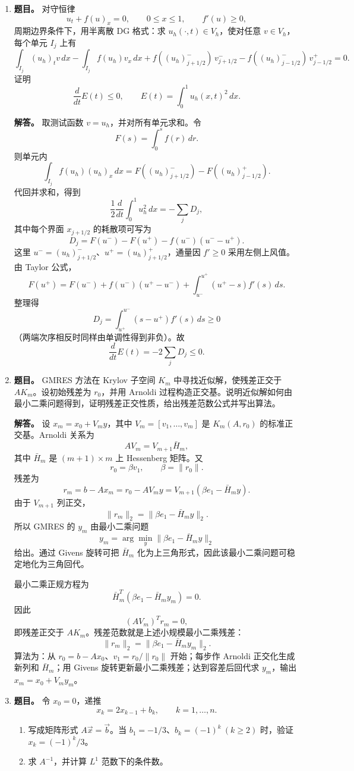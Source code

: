 ﻿\documentclass[UTF8,12pt]{ctexart}
\begin{document}
\begin{enumerate}[label=\textbf{\arabic*.},leftmargin=2.2em]
\item \textbf{题目。} 对守恒律
\[
u_t+f(u)_x=0,\qquad 0\le x\le1,\qquad f'(u)\ge0,
\]
周期边界条件下，用半离散 DG 格式：求 \(u_h(\cdot,t)\in V_h\)，使对任意 \(v\in V_h\)，每个单元 \(I_j\) 上有
\[
\int_{I_j}(u_h)_t v\,dx-\int_{I_j}f(u_h)v_x\,dx
+f((u_h)_{j+1/2}^-)\,v_{j+1/2}^-
-f((u_h)_{j-1/2}^-)\,v_{j-1/2}^+=0.
\]
证明
\[
\frac{d}{dt}E(t)\le0,\qquad
E(t)=\int_0^1 u_h(x,t)^2\,dx.
\]

\textbf{解答。} 取测试函数 \(v=u_h\)，并对所有单元求和。令
\[
F(s)=\int_0^s f(r)\,dr.
\]
则单元内
\[
\int_{I_j}f(u_h)(u_h)_x\,dx
=F((u_h)_{j+1/2}^-)-F((u_h)_{j-1/2}^+).
\]
代回并求和，得到
\[
\frac12\frac{d}{dt}\int_0^1u_h^2\,dx
=-\sum_j D_j,
\]
其中每个界面 \(x_{j+1/2}\) 的耗散项可写为
\[
D_j=
F(u^-)-F(u^+)-f(u^-)(u^- -u^+).
\]
这里 \(u^-=(u_h)_{j+1/2}^-\)、\(u^+=(u_h)_{j+1/2}^+\)，通量因 \(f'\ge0\) 采用左侧上风值。由 Taylor 公式，
\[
F(u^+)=F(u^-)+f(u^-)(u^+-u^-)
+\int_{u^-}^{u^+}(u^+-s)f'(s)\,ds.
\]
整理得
\[
D_j=\int_{u^+}^{u^-}(s-u^+)f'(s)\,ds\ge0
\]
（两端次序相反时同样由单调性得到非负）。故
\[
\frac{d}{dt}E(t)=-2\sum_jD_j\le0.
\]

\item \textbf{题目。} GMRES 方法在 Krylov 子空间 \(K_m\) 中寻找近似解，使残差正交于 \(AK_m\)。设初始残差为 \(r_0\)，并用 Arnoldi 过程构造正交基。说明近似解如何由最小二乘问题得到，证明残差正交性质，给出残差范数公式并写出算法。

\textbf{解答。} 设 \(x_m=x_0+V_my\)，其中 \(V_m=[v_1,\ldots,v_m]\) 是 \(K_m(A,r_0)\) 的标准正交基。Arnoldi 关系为
\[
AV_m=V_{m+1}\bar H_m,
\]
其中 \(\bar H_m\) 是 \((m+1)\times m\) 上 Hessenberg 矩阵。又
\[
r_0=\beta v_1,\qquad \beta=\|r_0\|.
\]
残差为
\[
r_m=b-Ax_m=r_0-AV_my
=V_{m+1}(\beta e_1-\bar H_my).
\]
由于 \(V_{m+1}\) 列正交，
\[
\|r_m\|_2=\|\beta e_1-\bar H_my\|_2.
\]
所以 GMRES 的 \(y_m\) 由最小二乘问题
\[
y_m=\arg\min_y\|\beta e_1-\bar H_my\|_2
\]
给出。通过 Givens 旋转可把 \(\bar H_m\) 化为上三角形式，因此该最小二乘问题可稳定地化为三角回代。

最小二乘正规方程为
\[
\bar H_m^T(\beta e_1-\bar H_my_m)=0.
\]
因此
\[
(AV_m)^Tr_m=0,
\]
即残差正交于 \(AK_m\)。残差范数就是上述小规模最小二乘残差：
\[
\|r_m\|_2=\|\beta e_1-\bar H_my_m\|_2.
\]
算法为：从 \(r_0=b-Ax_0\)、\(v_1=r_0/\|r_0\|\) 开始；每步作 Arnoldi 正交化生成新列和 \(\bar H_m\)；用 Givens 旋转更新最小二乘残差；达到容差后回代求 \(y_m\)，输出 \(x_m=x_0+V_my_m\)。

\item \textbf{题目。} 令 \(x_0=0\)，递推
\[
x_k=2x_{k-1}+b_k,\qquad k=1,\ldots,n.
\]
\begin{enumerate}[label=(\roman*),leftmargin=2.0em]
\item 写成矩阵形式 \(A\vec x=\vec b\)。当 \(b_1=-1/3\)、\(b_k=(-1)^k\ (k\ge2)\) 时，验证 \(x_k=(-1)^k/3\)。
\item 求 \(A^{-1}\)，并计算 \(L^1\) 范数下的条件数。
\end{enumerate}


\end{enumerate}
\end{document}
